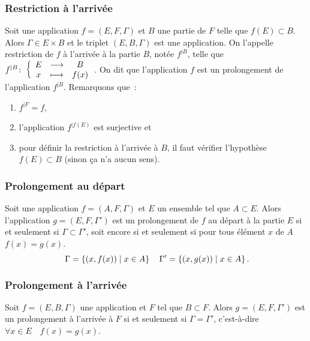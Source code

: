 \subsubsection{Restriction à l'arrivée}
\label{chap3-subsubsec:restrictionarr}
Soit une application \(f=(E,F,\Gamma)\) et \(B\) une partie de \(F\) telle que 
\(f(E) \subset B\). Alors \(\Gamma \in E \times B\) et le triplet 
\((E,B,\Gamma)\) est une application. On l'appelle restriction de \(f\) à 
l'arrivée à la partie \(B\), notée \(f^{|B}\), telle que 
\(f^{|B}\colon \left\{\begin{array}{ccc} E & \longrightarrow &B\\ x & \longmapsto & f(x) \end{array} \right.\). On dit que l'application \(f\) est un 
prolongement de l'application \(f^{|B}\). Remarquons que~:
\begin{enumerate}
    \item \(f^{|F}=f\), 
    \item l'application \(f^{|f(E)}\) est surjective et 
    \item pour définir la restriction à l'arrivée à \(B\), il faut vérifier 
        l'hypothèse \(f(E) \subset B\) (sinon ça n'a aucun sens).
\end{enumerate}
\subsubsection{Prolongement au départ}
\label{chap3-subsubsec:prolongementdep}
Soit une application \(f=(A,F,\Gamma)\) et \(E\) un ensemble tel que \(A \subset 
E\). Alors l'application \(g=(E,F,\Gamma')\) est un prolongement de \(f\) au 
départ à la partie \(E\) si et seulement si \(\Gamma \subset \Gamma'\), soit 
encore si et seulement si pour tous élément \(x\) de \(A\) \(f(x)=g(x)\).
\begin{equation}\
    \Gamma=\left\{(x,f(x))\mathrel{}\middle|\mathrel{}x \in A\right\} \quad \Gamma'=\left\{(x,g(x))\mathrel{}\middle|\mathrel{}x \in A\right\}.
\end{equation}
\subsubsection{Prolongement à l'arrivée}
\label{chap3-subsubsec:prolongementarr}
Soit \(f=(E,B,\Gamma)\) une application et \(F\) tel que \(B \subset F\). Alors 
\(g=(E,F,\Gamma')\) est un prolongement à l'arrivée à \(F\) si et seulement si 
\(\Gamma = \Gamma'\), c'est-à-dire \(\forall x \in E \quad f(x)=g(x)\).
